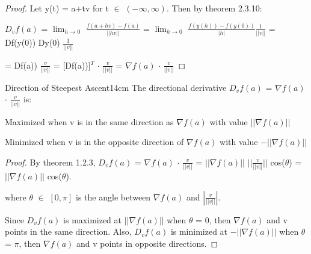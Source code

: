     \begin{proof}
        Let y(t) = a+tv for t $\in$ $(-\infty,\infty)$.
        Then by {\color{red} theorem 2.3.10}:

        \hspace{0.5cm}
        $D_vf(a)$
        = $\lim_{h \rightarrow 0}$ $\frac{f(a+hv) - f(a)}{||hv||}$
        = $\lim_{h \rightarrow 0}$ $\frac{f(y(h)) - f(y(0))}{|h|} \frac{1}{||v||}$
        = Df(y(0)) Dy(0) $\frac{1}{||v||}$

        \hspace{1.95cm}
        = Df(a)) $\frac{v}{||v||}$
        = [Df(a))]$^T$ $\cdot$ $\frac{v}{||v||}$
        = $\nabla f(a)$ $\cdot$ $\frac{v}{||v||}$
    \end{proof}

    \newpage



    \begin{wtheorem}{Direction of Steepest Ascent}{14cm}
        The directional derivative
        $D_vf(a)$ = $\nabla f(a)$ $\cdot$ $\frac{v}{||v||}$ is:
        
        \hspace{0.3cm}
        Maximized when v is in the same direction as $\nabla f(a)$
        with value $||\nabla f(a)||$

        \hspace{0.3cm}
        Minimized when v is in the opposite direction of $\nabla f(a)$
        with value $-||\nabla f(a)||$
    \end{wtheorem}

    \begin{proof}
        By {\color{red} theorem 1.2.3},
        $D_vf(a)$
        = $\nabla f(a)$ $\cdot$ $\frac{v}{||v||}$
        = $||\nabla f(a)||$ $||\frac{v}{||v||}||$ cos($\theta$)
        = $||\nabla f(a)||$ cos($\theta$).
        
        where $\theta$ $\in$ $[0,\pi]$ is the angle between
        $\nabla f(a)$ and $|\frac{v}{||v||}|$.

        Since $D_vf(a)$ is maximized at $||\nabla f(a)||$ when $\theta$ = 0,
        then $\nabla f(a)$ and v points in the same direction.
        Also, $D_vf(a)$ is minimized at $-||\nabla f(a)||$ when $\theta$ = $\pi$,
        then $\nabla f(a)$ and v points in opposite directions.
    \end{proof}

    \vspace{0.5cm}



